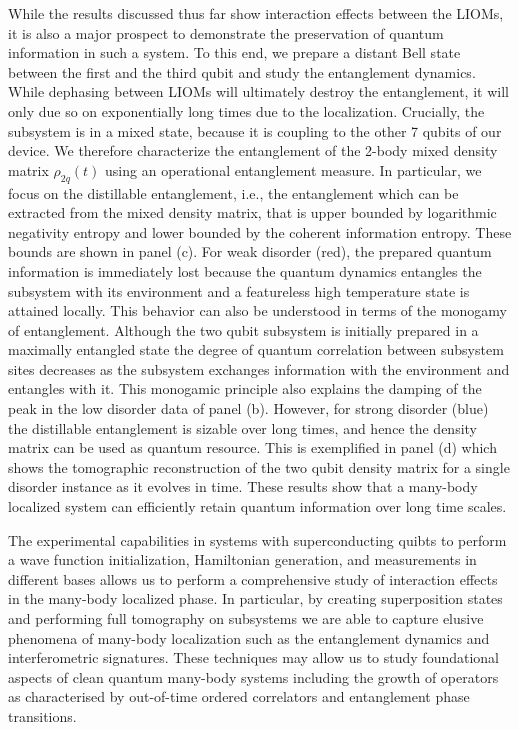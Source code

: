While the results discussed thus far show interaction effects between the LIOMs, it is also a major prospect to demonstrate the preservation of quantum information in such a system.
To this end, we prepare a distant Bell state between the first and the third qubit and study the entanglement dynamics.
While dephasing between LIOMs will ultimately destroy the entanglement, it will only due so on exponentially long times due to the localization.
Crucially, the subsystem is in a mixed state, because it is coupling to the other 7 qubits of our device.
We therefore characterize the entanglement of the 2-body mixed density matrix $\rho_{2q} \left( t \right)$ using an operational entanglement measure.
In particular, we focus on the distillable entanglement, i.e., the entanglement which can be extracted from the mixed density matrix, that is upper bounded by logarithmic negativity entropy and lower bounded by the coherent information entropy.
These bounds are shown in panel (c). For weak disorder (red), the prepared quantum information is immediately lost because the quantum dynamics entangles the subsystem with its environment and a featureless high temperature state is attained locally.
%
This behavior can also be understood in terms of the monogamy of entanglement.\autocite{Wootters2000}
Although the two qubit subsystem is initially prepared in a maximally entangled state the degree of quantum correlation between subsystem sites decreases as the subsystem exchanges information with the environment and entangles with it.
This monogamic principle also explains the damping of the peak in the low disorder data of panel (b).
%
However, for strong disorder (blue) the distillable entanglement is sizable over long times, and hence the density matrix can be used as quantum resource.
This is exemplified in panel (d) which shows the tomographic reconstruction of the two qubit density matrix for a single disorder instance as it evolves in time.
These results show that a many-body localized system can efficiently retain quantum information over long time scales.

The experimental capabilities in systems with superconducting quibts to perform a wave function initialization, Hamiltonian generation, and measurements in different bases allows us to perform a comprehensive study of interaction effects in the many-body localized phase.
In particular, by creating superposition states and performing full tomography on subsystems we are able to capture elusive phenomena of many-body localization such as the entanglement dynamics and interferometric signatures.
These techniques may allow us to study foundational aspects of clean quantum many-body systems including the growth of operators as characterised by out-of-time ordered correlators and entanglement phase transitions.

